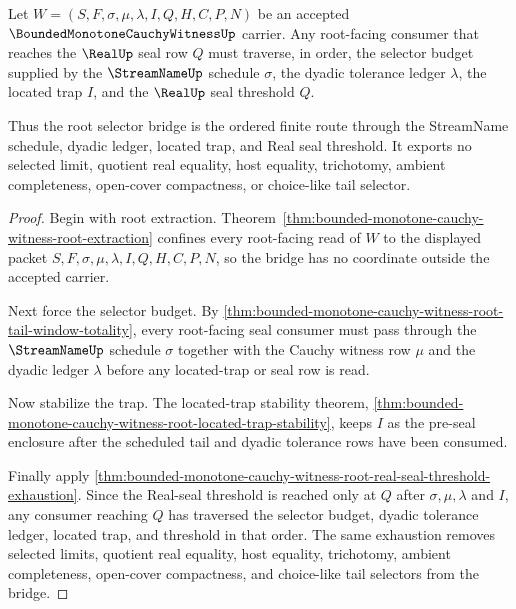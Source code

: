 \begin{theorem}
\label{thm:bounded-monotone-cauchy-witness-root-selector-bridge}
Let $W=(S,F,\sigma,\mu,\lambda,I,Q,H,C,P,N)$ be an accepted $\BoundedMonotoneCauchyWitnessUp$ carrier. Any root-facing consumer that reaches the $\RealUp$ seal row $Q$ must traverse, in order, the selector budget supplied by the $\StreamNameUp$ schedule $\sigma$, the dyadic tolerance ledger $\lambda$, the located trap $I$, and the $\RealUp$ seal threshold $Q$.

Thus the root selector bridge is the ordered finite route through the StreamName schedule, dyadic ledger, located trap, and Real seal threshold. It exports no selected limit, quotient real equality, host equality, trichotomy, ambient completeness, open-cover compactness, or choice-like tail selector.
\end{theorem}
\begin{proof}
Begin with root extraction. Theorem~\ref{thm:bounded-monotone-cauchy-witness-root-extraction} confines every root-facing read of $W$ to the displayed packet $S,F,\sigma,\mu,\lambda,I,Q,H,C,P,N$, so the bridge has no coordinate outside the accepted carrier.

Next force the selector budget. By \autoref{thm:bounded-monotone-cauchy-witness-root-tail-window-totality}, every root-facing seal consumer must pass through the $\StreamNameUp$ schedule $\sigma$ together with the Cauchy witness row $\mu$ and the dyadic ledger $\lambda$ before any located-trap or seal row is read.

Now stabilize the trap. The located-trap stability theorem, \autoref{thm:bounded-monotone-cauchy-witness-root-located-trap-stability}, keeps $I$ as the pre-seal enclosure after the scheduled tail and dyadic tolerance rows have been consumed.

Finally apply \autoref{thm:bounded-monotone-cauchy-witness-root-real-seal-threshold-exhaustion}. Since the Real-seal threshold is reached only at $Q$ after $\sigma,\mu,\lambda$ and $I$, any consumer reaching $Q$ has traversed the selector budget, dyadic tolerance ledger, located trap, and threshold in that order. The same exhaustion removes selected limits, quotient real equality, host equality, trichotomy, ambient completeness, open-cover compactness, and choice-like tail selectors from the bridge.
\end{proof}

